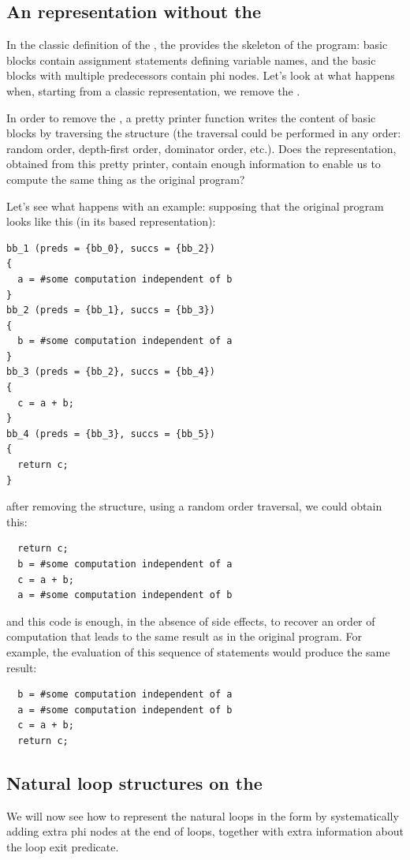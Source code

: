 \subsection{An \SSA{} representation without the \CFG{}}

In the classic definition of the \SSA{}, the \CFG{} provides the
skeleton of the program: basic blocks contain assignment statements
defining \SSA{} variable names, and the basic blocks with multiple
predecessors contain phi nodes.  Let's look at what happens when,
starting from a classic \SSA{} representation, we remove the \CFG{}.

In order to remove the \CFG{}, a pretty printer function writes the
content of basic blocks by traversing the \CFG{} structure (the \CFG{}
traversal could be performed in any order: random order, depth-first
order, dominator order, etc.).  Does the representation, obtained from
this pretty printer, contain enough information to enable us to
compute the same thing as the original program?

Let's see what happens with an example: supposing that the original
program looks like this (in its \CFG{} based \SSA{} representation):
\begin{verbatim}
bb_1 (preds = {bb_0}, succs = {bb_2})
{
  a = #some computation independent of b
}
bb_2 (preds = {bb_1}, succs = {bb_3})
{
  b = #some computation independent of a
}
bb_3 (preds = {bb_2}, succs = {bb_4})
{
  c = a + b;
}
bb_4 (preds = {bb_3}, succs = {bb_5})
{
  return c;
}
\end{verbatim}
after removing the \CFG{} structure, using a random order traversal,
we could obtain this:
\begin{verbatim}
  return c;
  b = #some computation independent of a
  c = a + b;
  a = #some computation independent of b
\end{verbatim}
and this \SSA{} code is enough, in the absence of side effects, to
recover an order of computation that leads to the same result as in
the original program.  For example, the evaluation of this sequence of
statements would produce the same result:
\begin{verbatim}
  b = #some computation independent of a
  a = #some computation independent of b
  c = a + b;
  return c;
\end{verbatim}

\subsection{Natural loop structures on the \SSA{}}
We will now see how to represent the natural loops in the \SSA{} form
by systematically adding extra phi nodes at the end of loops, together
with extra information about the loop exit predicate.


